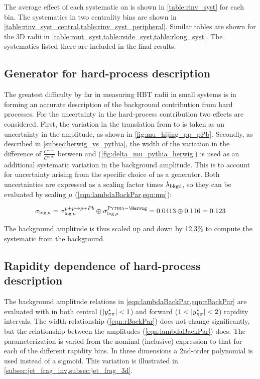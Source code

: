 The average effect of each systematic on \Rinv is shown in \cref{table:rinv_syst} for each \kt bin.
The systematics in two centrality bins are shown in \cref{table:rinv_syst_central,table:rinv_syst_peripheral}.
Similar tables are shown for the 3D radii in \cref{table:rout_syst,table:rside_syst,table:rlong_syst}.
The systematics listed there are included in the final results.

\subsection{Generator for hard-process description}
The greatest difficulty by far in measuring HBT radii in small systems is in forming an accurate description of the background contribution from hard processes.
For the uncertainty in the hard-process contribution two effects are considered.
First, the variation in the translation from \pp to \pPb is taken as an uncertainty in the amplitude, as shown in \cref{fig:mu_hijing_pp_pPb}.
Secondly, as described in \cref{subsec:herwig_vs_pythia}, the width of the variation in the difference of $\frac{C^{+-}}{C^{\pm\pm}}$ between \Pythia and \Herwig (\cref{fig:delta_mu_pythia_herwig}) is used as an additional systematic variation in the background amplitude.
This is to account for uncertainty arising from the specific choice of \Pythia as a generator.
Both uncertainties are expressed as a scaling factor times $\lambda_{\mathrm{bkgd}}$, so they can be evaluated by scaling $\mu$ (\cref{eqn:lambdaBackPar,eqn:mu}):

\begin{equation}
\sigma_{\log \mu} = \sigma^{p+p \rightarrow p+Pb}_{\log \mu} \oplus \sigma^{\Pythia-\Herwig}_{\log \mu} = 0.0413 \oplus 0.116 = 0.123
\end{equation}

The background amplitude \lbkgd is thus scaled up and down by 12.3\% to compute the systematic from the background.

\subsection{Rapidity dependence of hard-process description}

The background amplitude relations in \cref{eqn:lambdaBackPar,eqn:rBackPar} are evaluated with \Pythia in both central ($|y^{\star}_{\pi\pi}| < 1$) and forward ($1 < |y^{\star}_{\pi\pi}| < 2$) rapidity intervals.
The width relationship (\cref{eqn:rBackPar}) does not change significantly, but the relationship between the amplitudes (\cref{eqn:lambdaBackPar}) does.
The parameterization is varied from the nominal (inclusive) expression to that for each of the different rapidity bins.
In three dimensions a 2nd-order polynomial is used instead of a sigmoid.
This variation is illustrated in \cref{subsec:jet_frag_inv,subsec:jet_frag_3d}.

